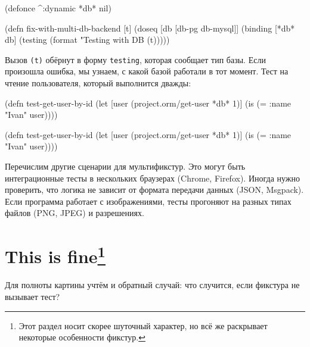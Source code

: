 \else

\begin{english}
  \begin{clojure}
(defonce ^:dynamic *db* nil)

(defn fix-with-multi-db-backend [t]
  (doseq [db [db-pg db-mysql]]
    (binding [*db* db]
      (testing (format "Testing with DB %
        (t)))))
  \end{clojure}
\end{english}

\fi

Вызов \verb|(t)| обёрнут в форму \verb|testing|, которая сообщает тип базы. Если
произошла ошибка, мы узнаем, с какой базой работали в тот момент. Тест на чтение
пользователя, который выполнится дважды:

\ifx\DEVICETYPE\MOBILE

\begin{english}
  \begin{clojure}
(defn test-get-user-by-id
  (let [user
        (project.orm/get-user *db* 1)]
    (is (= {:name "Ivan"} user))))
  \end{clojure}
\end{english}

\else

\begin{english}
  \begin{clojure}
(defn test-get-user-by-id
  (let [user (project.orm/get-user *db* 1)]
    (is (= {:name "Ivan"} user))))
  \end{clojure}
\end{english}

\fi

Перечислим другие сценарии для мультификстур. Это могут быть интеграционные
тесты в нескольких браузерах (Chrome, Firefox). Иногда нужно проверить, что
логика не зависит от формата передачи данных (JSON, Msgpack). Если программа
работает с изображениями, тесты прогоняют на разных типах файлов (PNG, JPEG) и
разрешениях.

\section[This is fine]{This is fine\footnote{%
    Этот раздел носит скорее шуточный характер,
    но всё же раскрывает некоторые особенности фикстур.}}

Для полноты картины учтём и обратный случай: что случится, если фикстура не
вызывает тест?


